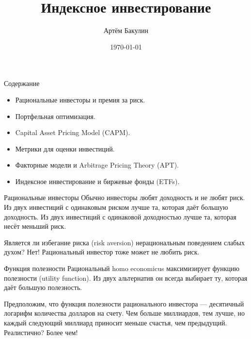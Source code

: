 \documentclass{beamer}
\title{Индексное инвестирование}
\author{Артём Бакулин}
\date{\today}
\begin{document}
\begin{frame}
\titlepage
\end{frame}



\begin{frame}{Содержание}
\justifying

\begin{itemize}
\justifying
\item Рациональные инвесторы и премия за риск.
\item Портфельная оптимизация.
\item Capital Asset Pricing Model (CAPM).
\item Метрики для оценки инвестиций.
\item Факторные модели и Arbitrage Pricing Theory (APT).
\item Индексное инвестирование и биржевые фонды (ETFs).
\end{itemize}
\end{frame}



\begin{frame}{Рациональные инвесторы}
\justify
Обычно инвесторы любят доходность и не любят риск. Из двух
инвестиций с одинаковым риском лучше та, которая даёт большую доходность. Из двух инвестиций с одинаковой доходностью лучше та, которая несёт меньший риск.

\vspace{\baselineskip}
Является ли избегание риска (risk aversion) нерациональным поведением слабых духом? Нет! Рациональный инвестор тоже может не любить риск.
\end{frame}



\begin{frame}{Функция полезности}
\justify
Рациональный homo economicus максимизирует функцию полезности (utility function). Из двух альтернатив он всегда выбирает ту, которая даёт большую полезность.

\vspace{\baselineskip}
Предположим, что функция полезности рационального инвестора --- десятичный логарифм количества долларов на счету. Чем больше миллиардов, тем лучше, но каждый следующий миллиард приносит меньше счастья, чем предыдущий. Реалистично? Более чем!
\end{frame}
\end{document}
